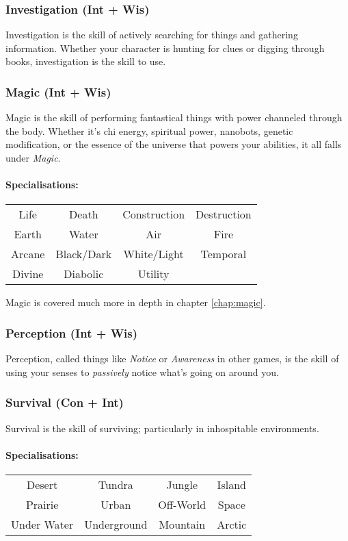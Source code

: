 \subsubsection{Investigation (Int + Wis)}
Investigation is the skill of actively searching for things and gathering information.
Whether your character is hunting for clues or digging through books, investigation is the skill to use.

\subsubsection{Magic (Int + Wis)}
Magic is the skill of performing fantastical things with power channeled through the body.
Whether it's chi energy, spiritual power, nanobots, genetic modification, or the essence of the universe that powers your abilities, it all falls under \textit{Magic}.

\paragraph{Specialisations:}
\begin{center}
  \begin{tabular}{c|c|c|c}
    Life  & Death & Construction & Destruction \\
    Earth & Water & Air & Fire \\
    Arcane & Black/Dark & White/Light & Temporal \\
    Divine & Diabolic   & Utility
  \end{tabular}
\end{center}
Magic is covered much more in depth in chapter \ref{chap:magic}.

\subsubsection{Perception (Int + Wis)}
Perception, called things like \textit{Notice} or \textit{Awareness} in other games, is the skill of using your senses to \textit{passively} notice what's going on around you.

\subsubsection{Survival (Con + Int)}
Survival is the skill of surviving; particularly in inhospitable environments.

\paragraph{Specialisations:}
\begin{center}
    \begin{tabular}{c|c|c|c}
        Desert & Tundra & Jungle & Island \\
        Prairie & Urban & Off-World & Space \\
        Under Water & Underground & Mountain & Arctic \\
    \end{tabular}
\end{center}


